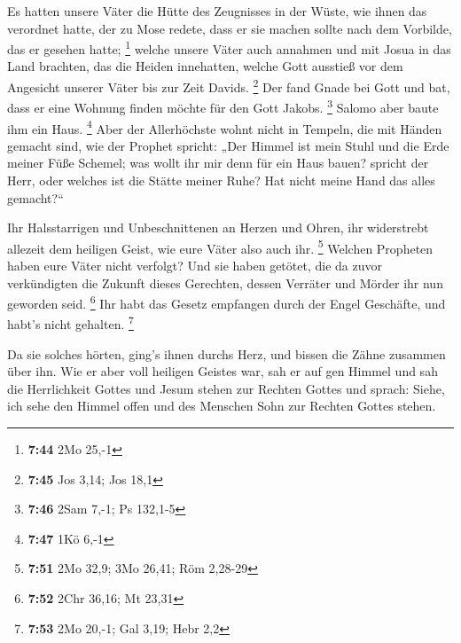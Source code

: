  Es hatten unsere Väter die Hütte des Zeugnisses in der
Wüste, wie ihnen das verordnet hatte, der zu Mose redete, dass er sie
machen sollte nach dem Vorbilde, das er gesehen hatte; \footnote{\textbf{7:44}
  2Mo 25,-1}  welche unsere Väter auch annahmen und mit
Josua in das Land brachten, das die Heiden innehatten, welche Gott
ausstieß vor dem Angesicht unserer Väter bis zur Zeit Davids.
\footnote{\textbf{7:45} Jos 3,14; Jos 18,1}  Der fand Gnade
bei Gott und bat, dass er eine Wohnung finden möchte für den Gott
Jakobs. \footnote{\textbf{7:46} 2Sam 7,-1; Ps 132,1-5} 
Salomo aber baute ihm ein Haus. \footnote{\textbf{7:47} 1Kö 6,-1}
 Aber der Allerhöchste wohnt nicht in Tempeln, die mit
Händen gemacht sind, wie der Prophet spricht:  „Der Himmel
ist mein Stuhl und die Erde meiner Füße Schemel; was wollt ihr mir denn
für ein Haus bauen? spricht der Herr, oder welches ist die Stätte meiner
Ruhe?  Hat nicht meine Hand das alles gemacht?{}``

 Ihr Halsstarrigen und Unbeschnittenen an Herzen und Ohren,
ihr widerstrebt allezeit dem heiligen Geist, wie eure Väter also auch
ihr. \footnote{\textbf{7:51} 2Mo 32,9; 3Mo 26,41; Röm 2,28-29}
 Welchen Propheten haben eure Väter nicht verfolgt? Und sie
haben getötet, die da zuvor verkündigten die Zukunft dieses Gerechten,
dessen Verräter und Mörder ihr nun geworden seid. \footnote{\textbf{7:52}
  2Chr 36,16; Mt 23,31}  Ihr habt das Gesetz empfangen
durch der Engel Geschäfte, und habt's nicht gehalten. \footnote{\textbf{7:53}
  2Mo 20,-1; Gal 3,19; Hebr 2,2}

 Da sie solches hörten, ging's ihnen durchs Herz, und
bissen die Zähne zusammen über ihn.  Wie er aber voll
heiligen Geistes war, sah er auf gen Himmel und sah die Herrlichkeit
Gottes und Jesum stehen zur Rechten Gottes  und sprach:
Siehe, ich sehe den Himmel offen und des Menschen Sohn zur Rechten
Gottes stehen.

